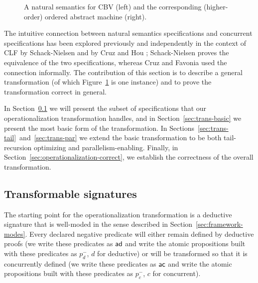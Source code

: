 \begin{figure}
\begin{minipage}[b]{0.36\linewidth}
\end{minipage}
\hspace{0.5cm}
\begin{minipage}[b]{0.64\linewidth}
\end{minipage}
\caption{A natural semantics for CBV (left) and the corresponding (higher-order)
  ordered abstract machine (right).}
\label{fig:example-transform-cbv}
\end{figure}

The intuitive connection between natural semantics specifications and
concurrent specifications has been explored previously and
independently in the context of CLF by Schack-Nielsen \cite{schacknielsen07induction} and by
Cruz and Hou \cite{cruz12parallel}; Schack-Nielsen proves the
equivalence of the two specifications, whereas Cruz and Favonia used
the connection informally. The contribution of this section is to
describe a general transformation (of which
Figure~\ref{fig:example-transform-cbv} is one instance) and to prove
the transformation correct in general. 

In Section~\ref{sec:trans-subset} we will present the subset of
specifications that our operationalization transformation handles, and
in Section~\ref{sec:trans-basic} we present the most basic form of the
transformation.  In
Sections~\ref{sec:trans-tail}~and~\ref{sec:trans-par} we extend the
basic transformation to be both tail-recursion optimizing and
parallelism-enabling. Finally, in
Section~\ref{sec:operationalization-correct}, we establish the
correctness of the overall transformation.

\subsection{Transformable signatures}
\label{sec:trans-subset}

The starting point for the operationalization transformation is a
deductive signature that is well-moded in the sense described in
Section~\ref{sec:framework-modes}. Every declared negative predicate
will either remain defined by deductive proofs (we write these
predicates as ${\sf ad}$ and write the atomic propositions built with
these predicates as $p_d^-$, $d$ for deductive) or will be transformed
so that it is concurrently defined (we write these predicates as ${\sf
  ac}$ and write the atomic propositions built with these predicates
as $p_c^-$, $c$ for concurrent).

